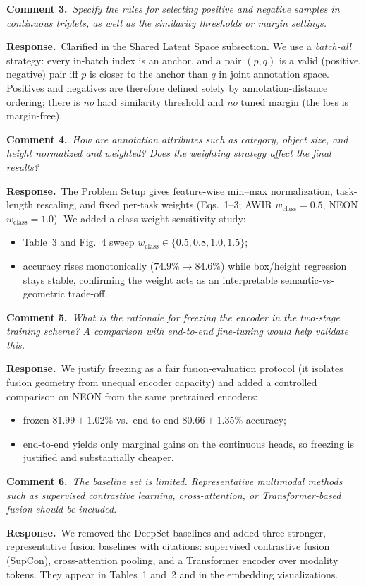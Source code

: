 \documentclass[10pt,twocolumn,letterpaper]{article}
\newcommand{\cmt}[2]{\smallskip\noindent\textbf{Comment #1.}\ \textit{#2}\par}
\newcommand{\resp}[1]{\noindent\textbf{Response.}\ #1\par}
\begin{document}
\cmt{3}{Specify the rules for selecting positive and negative samples in
continuous triplets, as well as the similarity thresholds or margin settings.}
\resp{Clarified in the Shared Latent Space subsection. We use a \emph{batch-all}
strategy: every in-batch index is an anchor, and a pair $(p,q)$ is a valid
(positive, negative) pair iff $p$ is closer to the anchor than $q$ in joint
annotation space. Positives and negatives are therefore defined solely by
annotation-distance ordering; there is \emph{no} hard similarity threshold and
\emph{no} tuned margin (the loss is margin-free).}

\cmt{4}{How are annotation attributes such as category, object size, and height
normalized and weighted? Does the weighting strategy affect the final results?}
\resp{The Problem Setup gives feature-wise min--max normalization, task-length
rescaling, and fixed per-task weights (Eqs.~1--3; AWIR $w_{\text{class}}{=}0.5$,
NEON $w_{\text{class}}{=}1.0$). We added a class-weight sensitivity study:}
\begin{itemize}
  \item Table~3 and Fig.~4 sweep $w_{\text{class}}\in\{0.5,0.8,1.0,1.5\}$;
  \item accuracy rises monotonically ($74.9\%\rightarrow84.6\%$) while box/height regression stays stable, confirming the weight acts as an interpretable semantic-vs-geometric trade-off.
\end{itemize}

\cmt{5}{What is the rationale for freezing the encoder in the two-stage training
scheme? A comparison with end-to-end fine-tuning would help validate this.}
\resp{We justify freezing as a fair fusion-evaluation protocol (it isolates
fusion geometry from unequal encoder capacity) and added a controlled comparison
on NEON from the same pretrained encoders:}
\begin{itemize}
  \item frozen $81.99\pm1.02\%$ vs.\ end-to-end $80.66\pm1.35\%$ accuracy;
  \item end-to-end yields only marginal gains on the continuous heads, so freezing is justified and substantially cheaper.
\end{itemize}

\cmt{6}{The baseline set is limited. Representative multimodal methods such as
supervised contrastive learning, cross-attention, or Transformer-based fusion
should be included.}
\resp{We removed the DeepSet baselines and added three stronger, representative
fusion baselines with citations: supervised contrastive fusion (SupCon),
cross-attention pooling, and a Transformer encoder over modality tokens. They
appear in Tables~1 and~2 and in the embedding visualizations.}
\end{document}
